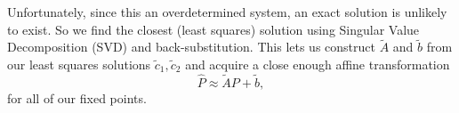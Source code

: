 \documentclass{article}
\begin{document}
Unfortunately, since this an overdetermined system, an exact solution is unlikely to exist. So we find the closest (least squares) solution using Singular Value Decomposition (SVD) and back-substitution. This lets us construct $\tilde{A}$ and $\tilde{b}$ from our least squares solutions $\tilde{c}_1, \tilde{c}_2$ and acquire a close enough affine transformation
\[
	\hat{P} \approx \tilde{A}P + \tilde{b},
\]
for all of our fixed points.

\begin{figure}
\end{figure}
\end{document}
